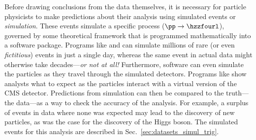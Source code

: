 Before drawing conclusions from the data themselves, it is necessary for particle physicists to make predictions about their analysis using simulated events or \emph{simulation}.
These events simulate a specific process (\eg $\pp \to \hzzfourl$), governed by some theoretical framework that is programmed mathematically into a software package.
Programs like \MGvATNLO and \POWHEG can simulate millions of rare (or even \emph{fictitious}) events in just a single day, whereas the same event in actual data might otherwise take decades---\emph{or not at all!}%
Furthermore, software can even simulate the particles as they travel through the simulated detectors.
Programs like \GEANTfour show analysts what to expect as the particles interact with a virtual version of the CMS detector.
Predictions from simulation can then be compared to the truth---the data---as a way to check the accuracy of the analysis.
For example, a surplus of events in data where none was expected may lead to the discovery of new particles, as was the case for the discovery of the Higgs boson.
The simulated events for this analysis are described in Sec.~\ref{sec:datasets_simul_trig}.

